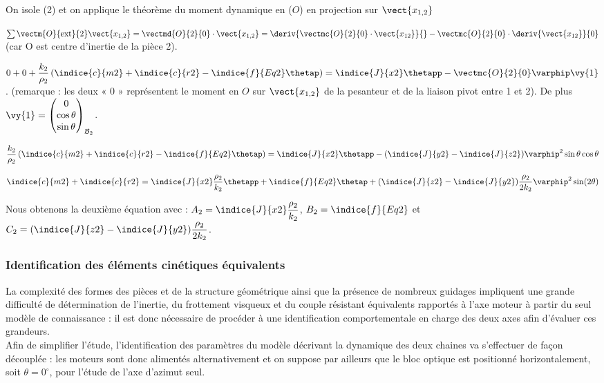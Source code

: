 \begin{corrige}
On isole (2) et on applique le théorème du moment dynamique en ($O$) en projection sur $\vect{x_{1,2}}$

$\sum \vectm{O}{\text{ext}}{2} \vect{x_{1,2}}  = \vectmd{O}{2}{0} \cdot \vect{x_{1,2}} = \deriv{\vectmc{O}{2}{0}\cdot \vect{x_{12}}}{} - \vectmc{O}{2}{0}\cdot\deriv{\vect{x_{12}}}{0}$ (car O est centre d’inertie de la pièce 2).

$0+0+\dfrac{k_2}{\rho_2}\left(\indice{c}{m2}+\indice{c}{r2}-\indice{f}{Eq2}\thetap\right)=\indice{J}{x2}  \thetapp - 
\vectmc{O}{2}{0} \varphip \vy{1}$. (remarque : les deux « 0 » représentent le moment en $O$ sur $\vect{x_{1,2}}$ de la pesanteur et de la liaison pivot entre 1 et 2). De plus $\vy{1}=\begin{pmatrix} 0 \\ \cos\theta \\ \sin \theta \end{pmatrix}_{\mathcal{B}_2}$.



$\dfrac{k_2}{\rho_2}\left(\indice{c}{m2}+\indice{c}{r2}-\indice{f}{Eq2}\thetap \right)=\indice{J}{x2} \thetapp-(\indice{J}{y2}-\indice{J}{z2} )   \varphip^2   \sin  \theta  \cos  \theta$

$\indice{c}{m2}+\indice{c}{r2}=\indice{J}{x2}\dfrac{\rho_2}{k_2} \thetapp+\indice{f}{Eq2}\thetap+(\indice{J}{z2}-\indice{J}{y2 })\dfrac{ \rho_2}{2  k_2}\varphip^2   \sin ( 2  \theta)$

Nous obtenons la deuxième équation avec : 
$A_2=\indice{J}{x2}  \dfrac{\rho_2}{k_2}$, $B_2=\indice{f}{Eq2}$ et $C_2=(\indice{J}{z2}-\indice{J}{y2})\dfrac{\rho_2}{2 k_2}$.

\end{corrige}
\else
\fi








\subsubsection{Identification des éléments cinétiques équivalents}
La complexité des formes des pièces et de la structure géométrique ainsi que la présence de nombreux guidages impliquent une grande difficulté de détermination de l'inertie, du frottement visqueux et du couple résistant équivalents rapportés à l'axe moteur à partir du seul modèle de connaissance : il est donc nécessaire de procéder à une identification comportementale en charge des deux axes afin d'évaluer ces grandeurs.\\
Afin de simplifier l'étude, l'identification des paramètres du modèle décrivant la dynamique des deux chaines va s'effectuer de façon découplée : les moteurs sont donc alimentés alternativement et on suppose par ailleurs que le bloc optique est positionné horizontalement, soit $\theta=0^{\circ}$, pour l'étude de l'axe d'azimut seul.\\


